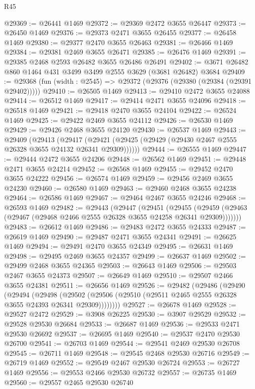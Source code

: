 \begin{lexlean}{R45}
\begin{coremodule}
@29369 := @26441 @1469
@29372 := @29369 @2472 @3655 @26447
@29373 := @26450 @1469
@29376 := @29373 @2471 @3655 @26455
@29377 := @26458 @1469
@29380 := @29377 @2470 @3655 @26463
@29381 := @26466 @1469
@29384 := @29381 @2469 @3655 @26471
@29385 := @26476 @1469
@29391 := @29385 @2468 @2593 @26482 @3655 @26486 @26491
@29402 := @3671 @26482 @860 @1464 @431 @3499 @3499 @2555 @3629 (@3681 @26482) @3684
@29409 := @29368 (fun (width : @2545) => @29372 (@29376 (@29380 (@29384 (@29391 @29402)))))
@29410 := @26505 @1469
@29413 := @29410 @2472 @3655 @24088
@29414 := @26512 @1469
@29417 := @29414 @2471 @3655 @24096
@29418 := @26518 @1469
@29421 := @29418 @2470 @3655 @24104
@29422 := @26524 @1469
@29425 := @29422 @2469 @3655 @24112
@29426 := @26530 @1469
@29429 := @29426 @2468 @3655 @24120
@29430 := @26537 @1469
@29443 := @29409
    (@29413
      (@29417 (@29421 (@29425 (@29429 (@29430 @2467 @2555 @26328 @3655 @24132 @26341 @29309))))))
@29444 := @26555 @1469
@29447 := @29444 @2472 @3655 @24206
@29448 := @26562 @1469
@29451 := @29448 @2471 @3655 @24214
@29452 := @26568 @1469
@29455 := @29452 @2470 @3655 @24222
@29456 := @26574 @1469
@29459 := @29456 @2469 @3655 @24230
@29460 := @26580 @1469
@29463 := @29460 @2468 @3655 @24238
@29464 := @26586 @1469
@29467 := @29464 @2467 @3655 @24246
@29468 := @26593 @1469
@29482 := @29443
    (@29447
      (@29451
        (@29455 (@29459 (@29463 (@29467 (@29468 @2466 @2555 @26328 @3655 @24258 @26341 @29309)))))))
@29483 := @26612 @1469
@29486 := @29483 @2472 @3655 @24333
@29487 := @26619 @1469
@29490 := @29487 @2471 @3655 @24341
@29491 := @26625 @1469
@29494 := @29491 @2470 @3655 @24349
@29495 := @26631 @1469
@29498 := @29495 @2469 @3655 @24357
@29499 := @26637 @1469
@29502 := @29499 @2468 @3655 @24365
@29503 := @26643 @1469
@29506 := @29503 @2467 @3655 @24373
@29507 := @26649 @1469
@29510 := @29507 @2466 @3655 @24381
@29511 := @26656 @1469
@29526 := @29482
    (@29486
      (@29490
        (@29494
          (@29498
            (@29502 (@29506 (@29510 (@29511 @2465 @2555 @26328 @3655 @24393 @26341 @29309))))))))
@29527 := @26678 @1469
@29528 := @29527 @2472
@29529 := @3908 @26225
@29530 := @3907 @29529
@29532 := @29528 @29530 @26684
@29533 := @26687 @1469
@29536 := @29533 @2471 @29530 @26692
@29537 := @26695 @1469
@29540 := @29537 @2470 @29530 @26700
@29541 := @26703 @1469
@29544 := @29541 @2469 @29530 @26708
@29545 := @26711 @1469
@29548 := @29545 @2468 @29530 @26716
@29549 := @26719 @1469
@29552 := @29549 @2467 @29530 @26724
@29553 := @26727 @1469
@29556 := @29553 @2466 @29530 @26732
@29557 := @26735 @1469
@29560 := @29557 @2465 @29530 @26740

\end{coremodule}
\end{lexlean}
